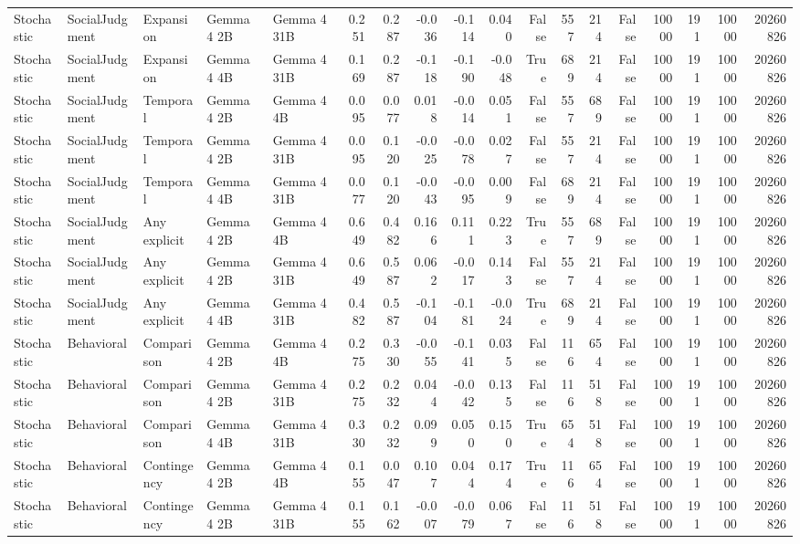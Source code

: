 \begin{tabular}{lllllrrrrrrrrrrrrr}
Stochastic & SocialJudgment & Expansion & Gemma 4 2B & Gemma 4 31B & 0.251 & 0.287 & -0.036 & -0.114 & 0.040 & False & 557 & 214 & False & 10000 & 191 & 10000 & 20260826 \\
Stochastic & SocialJudgment & Expansion & Gemma 4 4B & Gemma 4 31B & 0.169 & 0.287 & -0.118 & -0.190 & -0.048 & True & 689 & 214 & False & 10000 & 191 & 10000 & 20260826 \\
Stochastic & SocialJudgment & Temporal & Gemma 4 2B & Gemma 4 4B & 0.095 & 0.077 & 0.018 & -0.014 & 0.051 & False & 557 & 689 & False & 10000 & 191 & 10000 & 20260826 \\
Stochastic & SocialJudgment & Temporal & Gemma 4 2B & Gemma 4 31B & 0.095 & 0.120 & -0.025 & -0.078 & 0.027 & False & 557 & 214 & False & 10000 & 191 & 10000 & 20260826 \\
Stochastic & SocialJudgment & Temporal & Gemma 4 4B & Gemma 4 31B & 0.077 & 0.120 & -0.043 & -0.095 & 0.009 & False & 689 & 214 & False & 10000 & 191 & 10000 & 20260826 \\
Stochastic & SocialJudgment & Any explicit & Gemma 4 2B & Gemma 4 4B & 0.649 & 0.482 & 0.166 & 0.111 & 0.223 & True & 557 & 689 & False & 10000 & 191 & 10000 & 20260826 \\
Stochastic & SocialJudgment & Any explicit & Gemma 4 2B & Gemma 4 31B & 0.649 & 0.587 & 0.062 & -0.017 & 0.143 & False & 557 & 214 & False & 10000 & 191 & 10000 & 20260826 \\
Stochastic & SocialJudgment & Any explicit & Gemma 4 4B & Gemma 4 31B & 0.482 & 0.587 & -0.104 & -0.181 & -0.024 & True & 689 & 214 & False & 10000 & 191 & 10000 & 20260826 \\
Stochastic & Behavioral & Comparison & Gemma 4 2B & Gemma 4 4B & 0.275 & 0.330 & -0.055 & -0.141 & 0.035 & False & 116 & 654 & False & 10000 & 191 & 10000 & 20260826 \\
Stochastic & Behavioral & Comparison & Gemma 4 2B & Gemma 4 31B & 0.275 & 0.232 & 0.044 & -0.042 & 0.135 & False & 116 & 518 & False & 10000 & 191 & 10000 & 20260826 \\
Stochastic & Behavioral & Comparison & Gemma 4 4B & Gemma 4 31B & 0.330 & 0.232 & 0.099 & 0.050 & 0.150 & True & 654 & 518 & False & 10000 & 191 & 10000 & 20260826 \\
Stochastic & Behavioral & Contingency & Gemma 4 2B & Gemma 4 4B & 0.155 & 0.047 & 0.107 & 0.044 & 0.174 & True & 116 & 654 & False & 10000 & 191 & 10000 & 20260826 \\
Stochastic & Behavioral & Contingency & Gemma 4 2B & Gemma 4 31B & 0.155 & 0.162 & -0.007 & -0.079 & 0.067 & False & 116 & 518 & False & 10000 & 191 & 10000 & 20260826 \\

\end{tabular}
